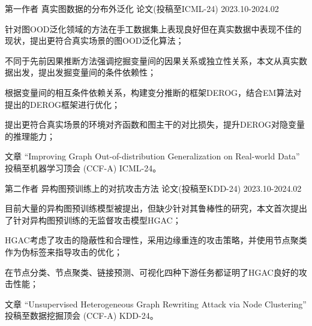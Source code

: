 \begin{cventries}

\cventry
{第一作者} %
{真实图数据的分布外泛化} %
{论文(投稿至ICML-24)} %
{2023.10-2024.02} %
{
  \begin{cvitems} 
    \item {针对图OOD泛化领域的方法在手工数据集上表现良好但在真实数据中表现不佳的现状，提出更符合真实场景的图OOD泛化算法；}
    \item {不同于先前因果推断方法强调挖掘变量间的因果关系或独立性关系，本文从真实数据出发，提出发掘变量间的条件依赖性；}
    \item {根据变量间的相互条件依赖关系，构建变分推断的框架DEROG，结合EM算法对提出的DEROG框架进行优化；}
    \item {提出更符合真实场景的环境对齐函数和图主干的对比损失，提升DEROG对隐变量的推理能力；}
    \item {文章 “Improving Graph Out-of-distribution Generalization on Real-world Data” 投稿至机器学习顶会 (CCF-A) ICML-24。}
  \end{cvitems}
}

\cventry
{第二作者} %
{异构图预训练上的对抗攻击方法} %
{论文(投稿至KDD-24)} %
{2023.10-2024.02} %
{
  \begin{cvitems} 
    \item {目前大量的异构图预训练模型被提出，但缺少针对其鲁棒性的研究，本文首次提出了针对异构图预训练的无监督攻击模型HGAC；}
    \item {HGAC考虑了攻击的隐蔽性和合理性，采用边缘重连的攻击策略，并使用节点聚类作为伪标签来指导攻击的优化；}
    \item {在节点分类、节点聚类、链接预测、可视化四种下游任务都证明了HGAC良好的攻击性能；}
    \item {文章 “Unsupervised Heterogeneous Graph Rewriting Attack via Node Clustering” 投稿至数据挖掘顶会 (CCF-A) KDD-24。}
  \end{cvitems}
}


\end{cventries}
